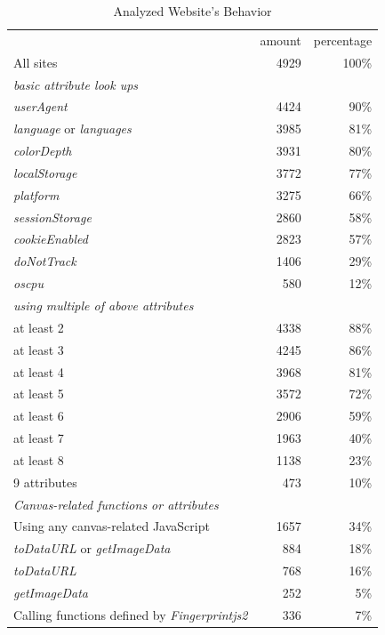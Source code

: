 \documentclass[
    fontsize=12pt,
    headings=small,
    parskip=half,
    bibliography=totoc,
    numbers=noenddot,
    open=any
    ]{scrreprt}
\begin{document}
\renewcommand{\arraystretch}{1.2}
\begin{table}
\centering
\caption{Analyzed Website's Behavior}
\begin{tabular}{l r r}
    \toprule
    & amount & percentage \\
    All sites & 4929 & 100\% \\
    \midrule
    \textit{basic attribute look ups} & & \\
    \textit{userAgent} & 4424 & 90\% \\ %
    \textit{language} or \textit{languages} & 3985 & 81\% \\ %
    \textit{colorDepth} & 3931 & 80\% \\ %
    \textit{localStorage} & 3772 & 77\% \\
    \textit{platform} & 3275 & 66\% \\ %
    \textit{sessionStorage} & 2860 & 58\% \\
    \textit{cookieEnabled} & 2823 & 57\% \\ %
    \textit{doNotTrack} & 1406 & 29\% \\ %
    \textit{oscpu} & 580 & 12\% \\ %
    \midrule
    \textit{using multiple of above attributes} & & \\
    at least 2 & 4338 & 88\% \\
    at least 3 & 4245 & 86\% \\
    at least 4 & 3968 & 81\% \\
    at least 5 & 3572 & 72\% \\
    at least 6 & 2906 & 59\% \\
    at least 7 & 1963 & 40\% \\
    at least 8 & 1138 & 23\% \\
    9 attributes & 473 & 10\% \\
    \midrule
    \textit{Canvas-related functions or attributes} & & \\
    Using any canvas-related JavaScript & 1657 & 34\% \\ %
    \textit{toDataURL} or \textit{getImageData} & 884 & 18\% \\ %
    \textit{toDataURL} & 768 & 16\% \\ %
    \textit{getImageData} & 252 & 5\% \\ %
    \midrule
    Calling functions defined by \textit{Fingerprintjs2} & 336 & 7\% \\ %
    \bottomrule
\end{tabular}
\label{table:dataprops}
\end{table}
\end{document}
